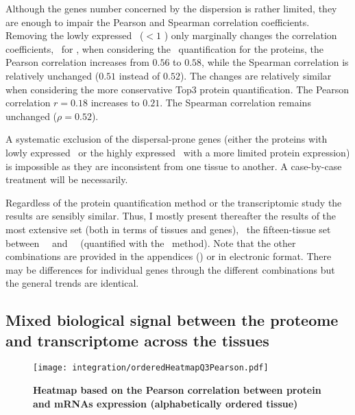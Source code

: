 Although the genes number concerned by the dispersion is rather limited,
they are enough to impair the Pearson and Spearman correlation coefficients.
Removing the lowly expressed \mRNAs\ ($<1$ \FPKM) only marginally changes
the correlation coefficients,
\eg\ for \kidney,
when considering the \PPKM\ quantification for the proteins,
the Pearson correlation
increases from $0.56$ to $0.58$,
while the Spearman correlation is relatively unchanged
($0.51$ instead of $0.52$).
The changes are relatively similar
when considering the more conservative Top3 protein quantification.
The Pearson correlation $r=0.18$ increases to $0.21$.
The Spearman correlation remains unchanged ($\rho=0.52$).

A systematic exclusion of the dispersal-prone genes
(either the proteins with lowly expressed \mRNAs\
or the highly expressed \mRNAs\ with a more limited protein expression)
is impossible
as they are inconsistent from one tissue to another.\label{memo:dispersedGenes}
A case-by-case treatment will be necessarily.

Regardless of the protein quantification method or
the transcriptomic study %
the results are sensibly similar.
Thus, I mostly present thereafter the results of the most extensive set
(both in terms of tissues and genes),
\ie\ the fifteen-tissue set between \uhlen\ \etal\ and \pandey\ \etal\
(quantified with the \PPKM\ method).
Note that the other combinations are provided
in the appendices ()
or in electronic format.
There may be differences for individual genes through the different combinations
but the general trends are identical.

\vspace{-5mm}
\subsection{Mixed biological signal between the proteome and transcriptome
across the tissues}
\vspace{-4mm}

\begin{figure}[!hbt]
    \texttt{[image: integration/orderedHeatmapQ3Pearson.pdf]}\centering
    \vspace{-3mm}
    \caption[Heatmap based on the Pearson correlation between protein and mRNAs
    expression (alphabetically ordered tissue)]{\label{fig:orderedHeatmapPearson}%
    \textbf{Heatmap based on the Pearson correlation between protein and mRNAs
    expression (alphabetically ordered tissue)}}
\end{figure}

